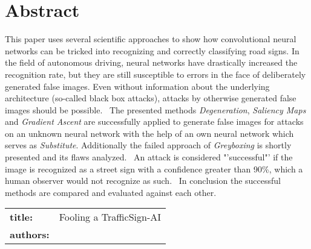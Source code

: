 \chapter*{Abstract} %
This paper uses several scientific approaches to show how convolutional neural networks can be tricked into recognizing and correctly classifying road signs.
In the field of autonomous driving, neural networks have drastically increased the recognition rate, but they are still susceptible to errors in the face of deliberately generated false images. Even without information about the underlying architecture (so-called black box attacks), attacks by otherwise generated false images should be possible.
~\newline The presented methods \textit{Degeneration}, \textit{Saliency Maps} and \textit{Gradient Ascent} are successfully applied to generate false images for attacks on an unknown neural network with the help of an own neural network which serves as \textit{Substitute}. Additionally the failed approach of \textit{Greyboxing} is shortly presented and its flaws analyzed.
~\newline An attack is considered "'successful"' if the image is recognized as a street sign with a confidence greater than 90\%, which a human observer would not recognize as such.
~\newline In conclusion the successful methods are compared and evaluated against each other.  
~\newline
~\newline
\begin{flushleft}
	\begin{tabular}{lp{11cm}}
		\textbf{title:} & Fooling a TrafficSign-AI \\
		\textbf{authors:}  & \autor \\
		
	\end{tabular} 
\end{flushleft}


